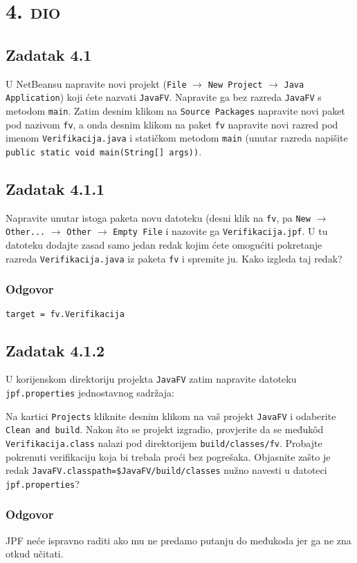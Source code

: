 \documentclass{article}
\newcommand{\sekcija}[1]{\section{\textsc{#1}}}
\newcommand{\dio}[1]{\sekcija{#1. dio}}
\newcommand{\zadatak}[1]{\subsection{Zadatak #1}}
\newcommand{\odgovor}{\subsubsection*{Odgovor}}
\newcommand{\code}[1]{\colorbox{blue!11}{\texttt{#1}}}
\begin{document}
\pagebreak





\dio{4}


\zadatak{4.1}

U NetBeansu napravite novi projekt (\texttt{File} $\rightarrow$ \texttt{New Project} $\rightarrow$ \texttt{Java Application}) koji ćete nazvati \texttt{JavaFV}. Napravite ga bez razreda \texttt{JavaFV} s metodom \texttt{main}. Zatim desnim klikom na \texttt{Source Packages} napravite novi paket pod nazivom \texttt{fv}, a onda desnim klikom na paket \texttt{fv} napravite novi razred pod imenom \texttt{Verifikacija.java} i statičkom metodom \texttt{main} (unutar razreda napišite\newline
\code{public static void main(String[] args){})}.\newline

\zadatak{4.1.1}

\noindent
Napravite unutar istoga paketa novu datoteku (desni klik na \texttt{fv}, pa \texttt{New} $\rightarrow$ \texttt{Other...} $\rightarrow$ \texttt{Other} $\rightarrow$ \texttt{Empty File} i nazovite ga \texttt{Verifikacija.jpf}. U tu datoteku dodajte zasad samo jedan redak kojim ćete omogućiti pokretanje razreda \texttt{Verifikacija.java} iz paketa \texttt{fv} i spremite ju. Kako izgleda taj redak?

\odgovor

\code{target = fv.Verifikacija}

\zadatak{4.1.2}

U korijenskom direktoriju projekta \texttt{JavaFV} zatim napravite datoteku \texttt{jpf.properties} jednostavnog sadržaja:


\noindent
Na kartici \texttt{Projects} kliknite desnim klikom na vaš projekt \texttt{JavaFV} i odaberite \texttt{Clean and
build}. Nakon što se projekt izgradio, provjerite da se međukôd \texttt{Verifikacija.class} nalazi pod direktorijem \texttt{build/classes/fv}. Probajte pokrenuti verifikaciju koja bi trebala proći bez pogrešaka. Objasnite zašto je redak \code{JavaFV.classpath=\${JavaFV}/build/classes} nužno navesti u datoteci \texttt{jpf.properties}?

\odgovor

JPF neće ispravno raditi ako mu ne predamo putanju do međukoda jer ga ne zna otkud učitati.
\end{document}
